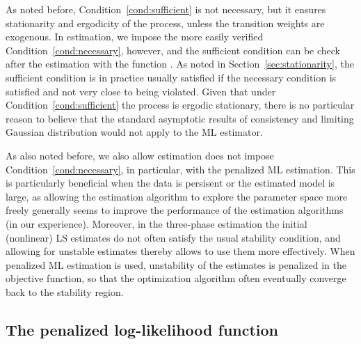 \documentclass[nojss]{jss}
\begin{document}
As noted before, Condition~\ref{cond:sufficient} is not necessary, but it ensures stationarity and ergodicity of the process, unless the transition weights are exogenous. In estimation, we impose the more easily verified Condition~\ref{cond:necessary}, however, and the sufficient condition can be check after the estimation with the function . As noted in Section~\ref{sec:stationarity}, the sufficient condition is in practice usually satisfied if the necessary condition is satisfied and not very close to being violated. Given that under Condition~\ref{cond:sufficient} the process is ergodic stationary, there is no particular reason to believe that the standard asymptotic results of consistency and limiting Gaussian distribution would not apply to the ML estimator.

As also noted before, we also allow estimation does not impose Condition~\ref{cond:necessary}, in particular, with the penalized ML estimation. This is particularly beneficial when the data is persisent or the estimated model is large, as allowing the estimation algorithm to explore the parameter space more freely generally seems to improve the performance of the estimation algorithms (in our experience). Moreover, in the three-phase estimation the initial (nonlinear) LS estimates do not often satisfy the usual stability condition, and allowing for unstable estimates thereby allows to use them more effectively. When penalized ML estimation is used, unstability of the estimates is penalized in the objective function, so that the optimization algorithm often eventually converge back to the stability region.

\subsection{The penalized log-likelihood function}
\end{document}
